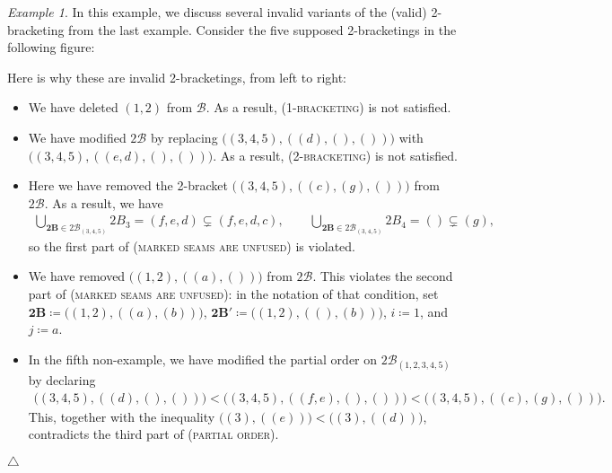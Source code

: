 \documentclass[11pt]{amsart}
\theoremstyle{definition}
\theoremstyle{remark}
\newtheorem{example}[theorem]{Example}
\theoremstyle{plain}
\newcommand{\btB}{{\mathbf{2B}}}
\newcommand{\sB}{\mathscr{B}}
\newcommand{\stB}{2\mathscr{B}}
\begin{document}
\begin{example}
In this example, we discuss several invalid variants of the (valid) 2-bracketing from the last example.
Consider the five supposed 2-bracketings in the following figure:
\begin{figure}[H]
\centering
\def\svgwidth{0.875\columnwidth}

\label{fig:2-bracketing_nonexamples}
\end{figure}
Here is why these are invalid 2-bracketings, from left to right:
\begin{itemize}
\item We have deleted $(1,2)$ from $\sB$.
As a result, \textsc{(1-bracketing)} is not satisfied.

\item We have modified $\stB$ by replacing $\bigl((3,4,5),((d),(),())\bigr)$ with $\bigl((3,4,5),((e,d),(),())\bigr)$.
As a result, \textsc{(2-bracketing)} is not satisfied.

\item Here we have removed the 2-bracket $\bigl((3,4,5),((c),(g),())\bigr)$ from $\stB$.
As a result, we have
\begin{align}
\bigcup_{\btB \in \stB_{(3,4,5)}} 2B_3 = (f,e,d) \subsetneq (f,e,d,c),
\qquad
\bigcup_{\btB \in \stB_{(3,4,5)}} 2B_4 = () \subsetneq (g),
\end{align}
so the first part of \textsc{(marked seams are unfused)} is violated.

\item We have removed $\bigl((1,2),((a),())\bigr)$ from $\stB$.
This violates the second part of \textsc{(marked seams are unfused)}: in the notation of that condition, set $\btB \coloneqq \bigl((1,2),((a),(b))\bigr)$, $\btB' \coloneqq \bigl((1,2),((),(b))\bigr)$, $i \coloneqq 1$, and $j \coloneqq a$.

\item In the fifth non-example, we have modified the partial order on $\stB_{(1,2,3,4,5)}$ by declaring
\begin{align}
\bigl((3,4,5),((d),(),())\bigr) < \bigl((3,4,5),((f,e),(),())\bigr) < \bigl((3,4,5),((c),(g),())\bigr).
\end{align}
This, together with the inequality $\bigl((3),((e))\bigr) < \bigl((3),((d))\bigr)$, contradicts the third part of \textsc{(partial order)}.
\end{itemize}
\null\hfill$\triangle$
\end{example}

\end{document}
